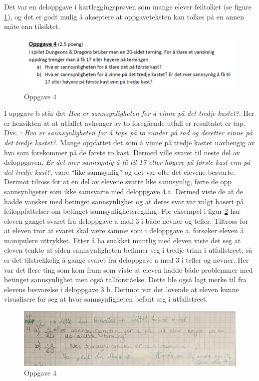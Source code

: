 \documentclass[main.tex]{subfiles}
\begin{document}
Det var en deloppgave i kartleggingsprøven som mange elever feiltolket (se figure \ref{fig:oppgave4}), og det er 
godt mulig å akseptere at oppgaveteksten kan tolkes på en annen måte enn tilsiktet.
\begin{figure}[h!]
\centering
\includegraphics[scale = 0.6]{../figures/oppgave4b.png}
\caption{Oppgave 4}
\label{fig:oppgave4}
\end{figure}
I oppgave b står det \emph{Hva er sannsynligheten for å vinne på det tredje kastet?}. Her er hensikten at
at utfallet avhenger av to foregående utfall er resultatet er tap. Dvs. : \emph{Hva er sannsynligheten for å 
tape på to runder på rad og deretter vinne på det tredje kastet?}. Mange oppfattet det som å vinne på tredje kastet 
uavhengig av hva som forekommer på de første to kast. Dermed ville svaret til neste del av deloppgaven, \emph{Er det mer 
sannsynlig å få til 17 eller høyere på første kast enn på det tredje kast?},  være ``like sannsynlig'' og det var ofte 
det elevene besvarte. Derimot tilross for at en del av elevene svarte like sannsynlig, førte de opp sannsynligeter som 
ikke samsvarte med deloppgave 4.a. Dermed viste de at de hadde vansker med betinget sannsynlighet og at deres svar var 
valgt basert på feiloppfattelser om betinget sannsynlighetsregning. For eksempel i figur \ref{fig:maria} har eleven 
ganget svaret fra deloppgave a med 3 i både nevner og teller. Tiltross for at eleven tror at svaret skal være samme som 
i deloppgave a, forsøker eleven å manipulere uttrykket. Etter å ha snakket muntlig med eleven viste det seg at eleven 
tenkte at siden sannsynligheten befinner seg i tredje trinn i utfallstreet, så er det tilstrekkelig å gange svaret fra 
deloppgave a med 3 i teller og nevner. Her var det flere ting som kom fram som viste at eleven hadde både problemmer
med betinget sannsynlighet men også tallforståelse. Dette ble også lagt merke til fra elevens besvarelse i deloppgave 3 
b. Derimot var det lovende at eleven kunne visualisere for seg at hvor sannsynligheten befant seg i utfallstreet. 
\begin{figure}[h!]
\centering
\includegraphics[scale = 0.3]{../figures/maria.png}
\caption{Oppgave 4}
\label{fig:maria}
\end{figure}
\end{document}
